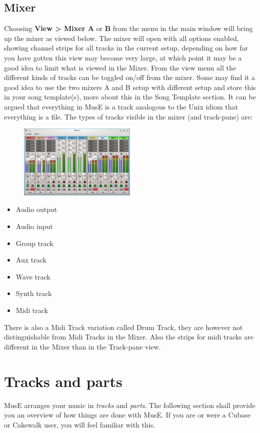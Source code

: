 \documentclass[a4paper]{report}
\newcommand{\menu}[1]{\textbf{#1}}
\begin{document}
\subsection{Mixer} \label{mixer} 
Choosing \menu{View > Mixer A} or \menu{B} from the menu in the main
window will bring up the mixer as viewed below. The mixer will open with
all options enabled, showing channel strips for all tracks in the current
setup, depending on how far you have gotten this view may become very large,
at which point it may be a good idea to limit what is viewed in the Mixer.
From the view menu all the different kinds of tracks can be toggled on/off
from the mixer. Some may find it a good idea to use the two mixers A and B
setup with different setup and store this in your song template(s), more
about this in the Song Template section. It can be argued that everything
in MusE is a track analogous to the Unix idiom that everything is a file.
The types of tracks visible in the mixer (and track-pane) are:
\begin{figure}
\includegraphics[width=0.5\textwidth]{pics/mixer} 
\end{figure}
\begin{itemize}
\item Audio output 
\item Audio input 
\item Group track 
\item Aux track 
\item Wave track 
\item Synth track 
\item Midi track 
\end{itemize}


There is also a Midi Track variation called Drum Track, they are
however not distinguishable from Midi Tracks in the Mixer. Also the
strips for midi tracks are different in the Mixer than in the
Track-pane view.

\section{Tracks and parts}
MusE arranges your music in \emph{tracks} and \emph{parts}. The following
section shall provide you an overview of how things are done with MusE.
If you are or were a Cubase or Cakewalk user, you will feel familiar with
this. 
\end{document}
